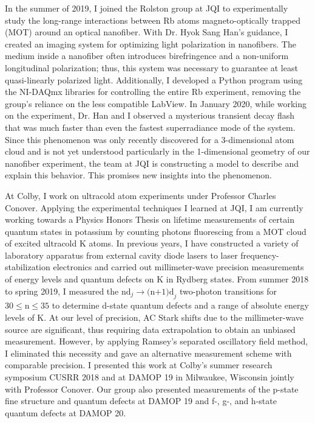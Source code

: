 \documentclass[12pt]{article}
\begin{document}
In the summer of 2019, I joined the Rolston group at JQI to experimentally study the long-range interactions between Rb atoms magneto-optically trapped (MOT) around an optical nanofiber. With Dr. Hyok Sang Han's guidance, I created an imaging system for optimizing light polarization in nanofibers. The medium inside a nanofiber often introduces birefringence and a non-uniform longitudinal polarization; thus, this system was necessary to guarantee at least  quasi-linearly polarized light. Additionally, I developed a Python program using the NI-DAQmx libraries for controlling the entire Rb experiment, removing the group's reliance on the less compatible LabView. In January 2020, while working on the experiment, Dr. Han and I observed a mysterious transient decay flash that was much faster than even the fastest superradiance mode of the system. Since this phenomenon was only recently discovered for a 3-dimensional atom cloud and is not yet understood particularly in the 1-dimensional geometry of our nanofiber experiment, the team at JQI is constructing a model to describe and explain this behavior. This promises new insights into the phenomenon.  \\ \vspace{-9pt}

At Colby, I work on ultracold atom experiments under Professor Charles Conover. Applying the experimental techniques I learned at JQI, I am currently working towards a Physics Honors Thesis on lifetime measurements of certain quantum states in potassium by counting photons fluorescing from a MOT cloud of excited ultracold K atoms. In previous years, I have constructed a variety of laboratory apparatus from external cavity diode lasers to laser frequency-stabilization electronics and carried out millimeter-wave precision measurements of energy levels and quantum defects on K in Rydberg states. From summer 2018 to spring 2019, I measured the $\mbox{nd}_{j} \to \mbox{(n+1)d}_{j}$ two-photon transitions for $\mbox{30} \leq \mbox{n} \leq \mbox{35}$ to determine d-state quantum defects and a range of absolute energy levels of K. At our level of precision, AC Stark shifts due to the millimeter-wave source are significant, thus requiring data extrapolation to obtain an unbiased measurement. However, by applying Ramsey's separated oscillatory field method, I eliminated this necessity and gave an alternative measurement scheme with comparable precision. I presented this work at Colby's summer research symposium CUSRR 2018 and at DAMOP 19 in Milwaukee, Wisconsin jointly with Professor Conover. Our group also presented measurements of the p-state fine structure and quantum defects at DAMOP 19 and f-, g-, and h-state quantum defects at DAMOP 20. \\ \vspace{-9pt}
\end{document}
